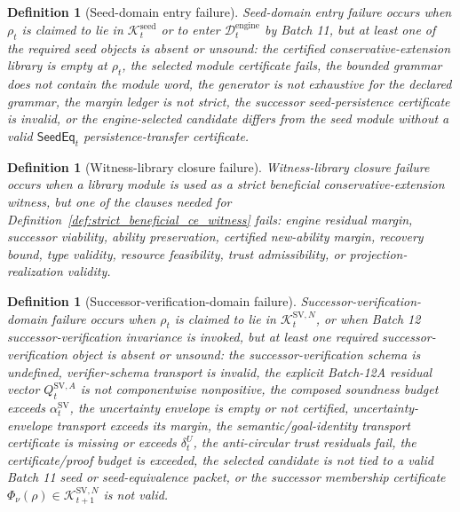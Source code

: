 \documentclass[11pt]{article}
\newtheorem{definition}[theorem]{Definition}
\newcommand{\1}{\mathbf{1}}
\providecommand{\Dcal}{\mathcal{D}}
\providecommand{\Kcal}{\mathcal{K}}
\begin{document}
\begin{definition}[Seed-domain entry failure]
Seed-domain entry failure occurs when \(\rho_t\) is claimed to lie in \(\Kcal_t^{\mathrm{seed}}\) or to enter \(\Dcal_t^{\mathrm{engine}}\) by Batch 11, but at least one of the required seed objects is absent or unsound: the certified conservative-extension library is empty at \(\rho_t\), the selected module certificate fails, the bounded grammar does not contain the module word, the generator is not exhaustive for the declared grammar, the margin ledger is not strict, the successor seed-persistence certificate is invalid, or the engine-selected candidate differs from the seed module without a valid \(\mathsf{SeedEq}_t\) persistence-transfer certificate.
\end{definition}

\begin{definition}[Witness-library closure failure]
Witness-library closure failure occurs when a library module is used as a strict beneficial conservative-extension witness, but one of the clauses needed for Definition~\ref{def:strict_beneficial_ce_witness} fails: engine residual margin, successor viability, ability preservation, certified new-ability margin, recovery bound, type validity, resource feasibility, trust admissibility, or projection-realization validity.
\end{definition}

\begin{definition}[Successor-verification-domain failure]
Successor-verification-domain failure occurs when \(\rho_t\) is claimed to lie in \(\Kcal_t^{\mathrm{SV},N}\), or when Batch 12 successor-verification invariance is invoked, but at least one required successor-verification object is absent or unsound: the successor-verification schema is undefined, verifier-schema transport is invalid, the explicit Batch-12A residual vector \(Q_t^{\mathrm{SV},A}\) is not componentwise nonpositive, the composed soundness budget exceeds \(\alpha_t^{\mathrm{SV}}\), the uncertainty envelope is empty or not certified, uncertainty-envelope transport exceeds its margin, the semantic/goal-identity transport certificate is missing or exceeds \(\delta_t^U\), the anti-circular trust residuals fail, the certificate/proof budget is exceeded, the selected candidate is not tied to a valid Batch 11 seed or seed-equivalence packet, or the successor membership certificate \(\Phi_\nu(\rho)\in\Kcal_{t+1}^{\mathrm{SV},N}\) is not valid.
\end{definition}
\end{document}
